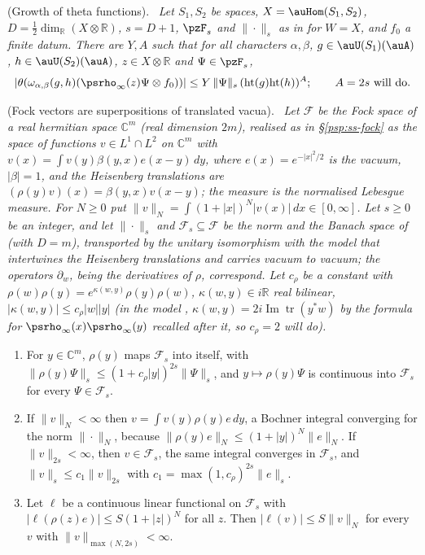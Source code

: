 \documentclass[10pt]{amsart}
\theoremstyle{definition}
\theoremstyle{remark}
\newcommand{\C}{\mathbb C}
\newcommand{\R}{\mathbb R}
\newcommand{\Iml}{\operatorname{Im}}
\newenvironment{quotedthm}[2]{\par\medskip\noindent\begingroup
  \textbf{#1}#2.\ \itshape\ignorespaces}{\endgroup\par\medskip}
\begin{document}
\begin{quotedthm}{\cite[Lemma~3.29]{P53}}{ (Growth of theta functions)}
Let $S_1,S_2$ be spaces, $X=\auHom(S_1,S_2)$, $D=\frac12\dim_\R(X\otimes\R)$, $s=D+1$, $\pzF_s$ and
$\|\cdot\|_s$ as in {\cite[Lemma~8.2]{P49}} for $W=X$, and $f_0$ a finite datum. There are $Y,A$ such that for
all characters $\alpha,\beta$, $g\in\auU(S_1)(\auA)$, $h\in\auU(S_2)(\auA)$, $z\in X\otimes\R$ and
$\Psi\in\pzF_s$,
\[
|\theta(\omega_{\alpha,\beta}(g,h)(\psrho_\infty(z)\Psi\otimes f_0))|\le Y\,\|\Psi\|_s\,
(\mathrm{ht}(g)\mathrm{ht}(h))^{A};\qquad A=2s\text{ will do.}
\]
\end{quotedthm}

\begin{quotedthm}{\cite[Lemma~3.30]{P53}}{ (Fock vectors are superpositions of translated vacua)}
Let $\mathcal F$ be the Fock space of a real hermitian space $\C^m$ (real dimension $2m$), realised as in
\S\ref{psp:ss-fock} as the space of functions $v\in L^1\cap L^2$ on $\C^m$ with $v(x)=\int v(y)\beta(y,x)
e(x-y)\,dy$, where $e(x)=e^{-|x|^2/2}$ is the vacuum, $|\beta|=1$, and the Heisenberg translations are
$(\rho(y)v)(x)=\beta(y,x)v(x-y)$; the measure is the normalised Lebesgue measure. For $N\ge0$ put
$\|v\|_N=\int(1+|x|)^N|v(x)|\,dx\in[0,\infty]$. Let $s\ge0$ be an integer, and let $\|\cdot\|_s$ and
$\mathcal F_s\subseteq\mathcal F$ be the norm and the Banach space of {\cite[Lemma~8.2]{P49}} (with $D=m$),
transported by the unitary isomorphism with the model {\cite[(41)]{P49}} that intertwines the
Heisenberg translations and carries vacuum to vacuum; the operators $\partial_w$, being the derivatives
of $\rho$, correspond. Let $c_\rho$ be a constant with
$\rho(w)\rho(y)=e^{\kappa(w,y)}\rho(y)\rho(w)$, $\kappa(w,y)\in i\R$ real bilinear,
$|\kappa(w,y)|\le c_\rho|w||y|$ (in the model {\cite[(41)]{P49}}, $\kappa(w,y)=2i\Iml\operatorname{tr}(y^*w)$ by the
formula for $\psrho_\infty(x)\psrho_\infty(y)$ recalled after it, so $c_\rho=2$ will do).
\begin{enumerate}
\item[\textup{(a)}] For $y\in\C^m$, $\rho(y)$ maps $\mathcal F_s$ into itself, with
$\|\rho(y)\Psi\|_s\le(1+c_\rho|y|)^{2s}\|\Psi\|_s$, and $y\mapsto\rho(y)\Psi$ is continuous into
$\mathcal F_s$ for every $\Psi\in\mathcal F_s$.
\item[\textup{(b)}] If $\|v\|_N<\infty$ then $v=\int v(y)\rho(y)e\,dy$, a Bochner integral converging for
the norm $\|\cdot\|_N$, because $\|\rho(y)e\|_N\le(1+|y|)^N\|e\|_N$. If $\|v\|_{2s}<\infty$, then
$v\in\mathcal F_s$, the same integral converges in $\mathcal F_s$, and $\|v\|_s\le c_1\|v\|_{2s}$ with
$c_1=\max(1,c_\rho)^{2s}\|e\|_s$.
\item[\textup{(c)}] Let $\ell$ be a continuous linear functional on $\mathcal F_s$ with $|\ell(\rho(z)e)|\le
S(1+|z|)^N$ for all $z$. Then $|\ell(v)|\le S\|v\|_N$ for every $v$ with $\|v\|_{\max(N,2s)}<\infty$.
\end{enumerate}
\end{quotedthm}
\end{document}
